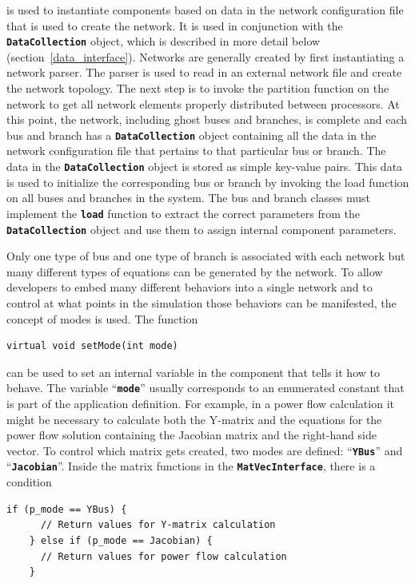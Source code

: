 is used to instantiate components based on data in the network configuration
file that is used to create the network. It is used in conjunction with the
\texttt{\textbf{DataCollection}} object, which is described in more detail
below (section~\ref{data_interface}). Networks are generally created by first instantiating a network parser. The parser is used to read in an external network file and create the network topology. The next step is to invoke the partition function on the network to get all network elements properly distributed between processors. At this point, the network, including ghost buses and branches, is complete and each bus and branch has a \texttt{\textbf{DataCollection}} object containing all the data in the network configuration file that pertains to that particular bus or branch. The data in the \texttt{\textbf{DataCollection}} object is stored as simple key-value pairs. This data is used to initialize the corresponding bus or branch by invoking the load function on all buses and branches in the system. The bus and branch classes must implement the \texttt{\textbf{load}} function to extract the correct parameters from the \texttt{\textbf{DataCollection}} object and use them to assign internal component parameters.

Only one type of bus and one type of branch is associated with each network but many different types of equations can be generated by the network. To allow developers to embed many different behaviors into a single network and to control at what points in the simulation those behaviors can be manifested, the concept of modes is used. The function

{
\color{red}
\begin{Verbatim}[fontseries=b]
virtual void setMode(int mode)
\end{Verbatim}
}

can be used to set an internal variable in the component that tells it how to behave. The variable ``\texttt{\textbf{mode}}'' usually corresponds to an enumerated constant that is part of the application definition. For example, in a power flow calculation it might be necessary to calculate both the Y-matrix and the equations for the power flow solution containing the Jacobian matrix and the right-hand side vector. To control which matrix gets created, two modes are defined: ``\texttt{\textbf{YBus}}'' and ``\texttt{\textbf{Jacobian}}''. Inside the matrix functions in the \texttt{\textbf{MatVecInterface}}, there is a condition

{
\color{red}
\begin{Verbatim}[fontseries=b]
    if (p_mode == YBus) {
      // Return values for Y-matrix calculation
    } else if (p_mode == Jacobian) {
      // Return values for power flow calculation
    }
\end{Verbatim}
}

